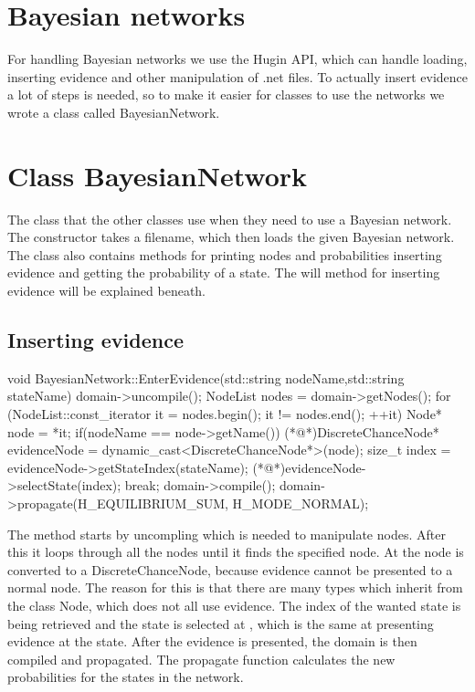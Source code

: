 \section{Bayesian networks}
	For handling Bayesian networks we use the Hugin API, which can handle loading, inserting evidence and other manipulation of .net files. To actually 
	insert evidence a lot of steps is needed, so to make it easier for classes to use the networks we wrote a class called BayesianNetwork.
	\section{Class BayesianNetwork}
		The class that the other classes use when they need to use a Bayesian network. The constructor takes a filename, which then loads the given 
		Bayesian network. The class also contains methods for printing nodes and probabilities inserting evidence and getting the probability of a state. 
		The will method for inserting evidence will be explained beneath.
		\subsection*{Inserting evidence}
			\begin{Sourcecode}[caption=EnterEvidence method]
void BayesianNetwork::EnterEvidence(std::string nodeName,std::string stateName)
{
	domain->uncompile();
	NodeList nodes = domain->getNodes();
	for (NodeList::const_iterator it = nodes.begin(); it != nodes.end(); ++it)
	{
		Node* node = *it;
		if(nodeName == node->getName())
		{
			(*@\lnote@*)DiscreteChanceNode* evidenceNode = dynamic_cast<DiscreteChanceNode*>(node);
			size_t index = evidenceNode->getStateIndex(stateName);
			(*@\lnote@*)evidenceNode->selectState(index);
			break;
		}
	}
	domain->compile();
	domain->propagate(H_EQUILIBRIUM_SUM, H_MODE_NORMAL);
}
			\end{Sourcecode}
			The method starts by uncompling which is needed to manipulate nodes. After this it loops through all the nodes until it finds the specified 
			node. At  the node is converted to a DiscreteChanceNode, because evidence cannot be presented to a normal node. The reason for this 
			is that there are many types which inherit from the class Node, which does not all use evidence. The index of the wanted state is being 
			retrieved and the state is selected at , which is the same at presenting evidence at the state. After the evidence is presented, the 
			domain is then compiled and propagated. The propagate function calculates the new probabilities for the states in the network.
